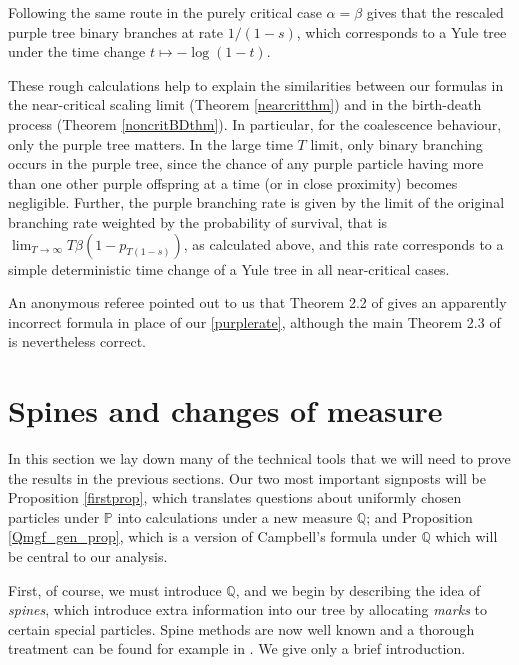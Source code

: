 \documentclass{article}
\theoremstyle{plain}
\theoremstyle{definition}
\newcommand{\Q}{\mathbb{Q}}
\renewcommand{\P}{\mathbb{P}}
\begin{document}
Following the same route in the purely critical case $\alpha=\beta$ gives that the rescaled purple tree binary branches at rate $1/(1-s)$, which corresponds to a Yule tree under the time change $t\mapsto -\log(1-t)$.

These rough calculations help to explain the similarities between our formulas in the near-critical scaling limit (Theorem \ref{nearcritthm}) and in the birth-death process (Theorem \ref{noncritBDthm}). 
In particular, for the coalescence behaviour, only the purple tree matters. In the large time $T$ limit, only binary branching occurs in the purple tree, since the chance of any purple particle having more than one other purple offspring at a time (or in close proximity) becomes negligible. Further, the purple branching rate is given by the limit of the original branching rate weighted by the probability of survival, that is $\lim_{T\rightarrow\infty} T \beta(1-p_{T(1-s)})$, as calculated above, and this rate corresponds to a simple deterministic time change of a Yule tree in all near-critical cases.

An anonymous referee pointed out to us that Theorem 2.2 of \cite{oconnell:genealogy_mrca} gives an apparently incorrect formula in place of our \eqref{purplerate}, although the main Theorem 2.3 of \cite{oconnell:genealogy_mrca} is nevertheless correct.





















\section{Spines and changes of measure}\label{CoMsec}

In this section we lay down many of the technical tools that we will need to prove the results in the previous sections. Our two most important signposts will be Proposition \ref{firstprop}, which translates questions about uniformly chosen particles under $\P$ into calculations under a new measure $\Q$; and Proposition \ref{Qmgf_gen_prop}, which is a version of Campbell's formula under $\Q$ which will be central to our analysis.

First, of course, we must introduce $\Q$, and we begin by describing the idea of \emph{spines}, which introduce extra information into our tree by allocating \emph{marks} to certain special particles. Spine methods are now well known and a thorough treatment can be found for example in \cite{harris_roberts:many_to_few}. We give only a brief introduction.
\end{document}
